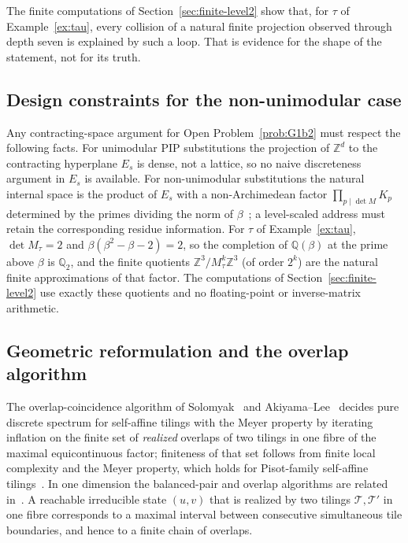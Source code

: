 \documentclass[11pt]{amsart}
\theoremstyle{plain}
\theoremstyle{definition}
\theoremstyle{remark}
\newcommand{\Z}{\mathbb{Z}}
\newcommand{\Q}{\mathbb{Q}}
\newcommand{\PDS}{pure discrete spectrum}
\begin{document}
The finite computations of Section~\ref{sec:finite-level2} show that, for $\tau$ of Example~\ref{ex:tau}, every collision of a natural finite projection observed through depth seven is explained by such a loop. That is evidence for the shape of the statement, not for its truth.

\subsection{Design constraints for the non-unimodular case}\label{sec:nonunit}

Any contracting-space argument for Open Problem~\ref{prob:G1b2} must respect the following facts. For unimodular PIP substitutions the projection of $\Z^d$ to the contracting hyperplane $E_s$ is dense, not a lattice, so no naive discreteness argument in $E_s$ is available. For non-unimodular substitutions the natural internal space is the product of $E_s$ with a non-Archimedean factor $\prod_{p\mid\det M}K_p$ determined by the primes dividing the norm of $\beta$~\cite{MT,BBK}; a level-scaled address must retain the corresponding residue information. For $\tau$ of Example~\ref{ex:tau}, $\det M_\tau=2$ and $\beta(\beta^2-\beta-2)=2$, so the completion of $\Q(\beta)$ at the prime above $\beta$ is $\Q_2$, and the finite quotients $\Z^3/M_\tau^k\Z^3$ (of order $2^k$) are the natural finite approximations of that factor. The computations of Section~\ref{sec:finite-level2} use exactly these quotients and no floating-point or inverse-matrix arithmetic.

\subsection{Geometric reformulation and the overlap algorithm}\label{sec:overlap}

The overlap-coincidence algorithm of Solomyak~\cite{Solomyak97} and Akiyama--Lee~\cite{AL} decides \PDS{} for self-affine tilings with the Meyer property by iterating inflation on the finite set of \emph{realized} overlaps of two tilings in one fibre of the maximal equicontinuous factor; finiteness of that set follows from finite local complexity and the Meyer property, which holds for Pisot-family self-affine tilings~\cite{LS}. In one dimension the balanced-pair and overlap algorithms are related in~\cite{SS}. A reachable irreducible state $(u,v)$ that is realized by two tilings $\mathcal T,\mathcal T'$ in one fibre corresponds to a maximal interval between consecutive simultaneous tile boundaries, and hence to a finite chain of overlaps.
\end{document}
